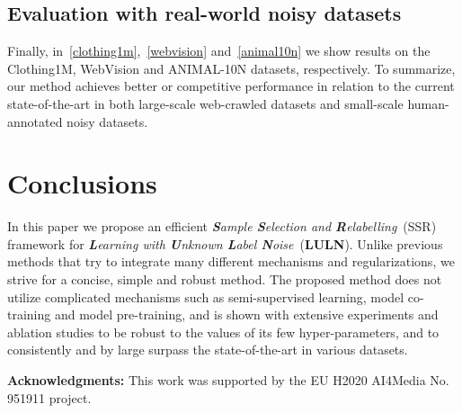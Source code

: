 \documentclass{bmvc2k}
\begin{document}
\subsection{Evaluation with real-world noisy datasets}
\label{4-4}
Finally, in~\cref{clothing1m},~\cref{webvision} and~\cref{animal10n} we show results on the Clothing1M, WebVision and ANIMAL-10N datasets, respectively. To summarize, our method achieves better or competitive performance in relation to the current state-of-the-art in both large-scale web-crawled datasets and small-scale human-annotated noisy datasets.




\section{Conclusions}
\label{5}

In this paper we propose an efficient \textit{\textbf{S}ample \textbf{S}election and \textbf{R}elabelling}~(SSR) framework for \textit{\textbf{L}earning with \textbf{U}nknown \textbf{L}abel \textbf{N}oise}~(\textbf{LULN}). Unlike previous methods that try to integrate many different mechanisms and regularizations, we strive for a concise, simple and robust method. The proposed method does not utilize complicated mechanisms such as semi-supervised learning, model co-training and model pre-training, and is shown with extensive experiments and ablation studies to be robust to the values of its few hyper-parameters, and to consistently and by large surpass the state-of-the-art in various datasets. 

\vspace{5pt}
{\setlength{\parindent}{0cm}
\textbf{Acknowledgments:} This work was supported by the EU H2020 AI4Media No. 951911 project.
}
\end{document}
